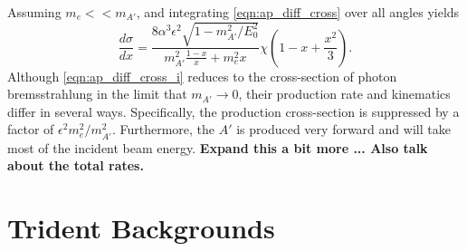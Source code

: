 Assuming $m_{e} << m_{A'}$, 
and integrating \ref{eqn:ap_diff_cross} over all angles yields
\begin{equation}
    \label{eqn:ap_diff_cross_i}
    \frac{d\sigma}{dx} = \frac{8\alpha^{3}\epsilon^{2} \sqrt{1-m_{A'}^{2}/E_{0}^{2}}}
    {m_{A'}^{2}\frac{1-x}{x} + m_{e}^{2}x}\chi
    \left( 1 - x + \frac{x^{2}}{3}\right).
\end{equation}
Although \ref{eqn:ap_diff_cross_i} reduces to the cross-section of photon 
bremsstrahlung in the limit that $m_{A'} \rightarrow 0$, their production rate
and kinematics differ in several ways. Specifically, the production 
cross-section is suppressed by a factor of $\epsilon^{2}m_{e}^{2}/m_{A'}^{2}$.
Furthermore, the $A'$ is produced very forward and will take most of the 
incident beam energy. \textbf{Expand this a bit more ... Also talk about the
total rates.}

\section{Trident Backgrounds}

